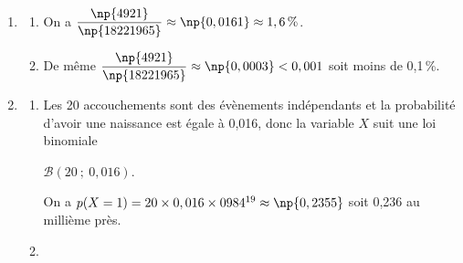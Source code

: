 
\medskip

\begin{enumerate}
\item %
	\begin{enumerate}
		\item %
		On a $\dfrac{\np{4921}}{\np{18221965}} \approx \np{0,0161} \approx 1,6\,\%$.
		\item %
De même $\dfrac{\np{4921}}{\np{18221965}} \approx \np{0,0003}< 0,001$ soit moins de 0,1\,\%.

%
%
%
%
	\end{enumerate}
\item %


	\begin{enumerate}
		\item %
Les 20 accouchements sont des évènements indépendants et la probabilité d'avoir une naissance est égale à 0,016, donc la variable $X$ suit une loi binomiale 

$\mathcal{B}(20~;~0,016)$.

On a $p(X = 1) = 20 \times 0,016 \times 0984^{19} \approx \np{0,2355}$ soit 0,236 au millième près.
		\item %
		

\end{enumerate}
\end{enumerate}
